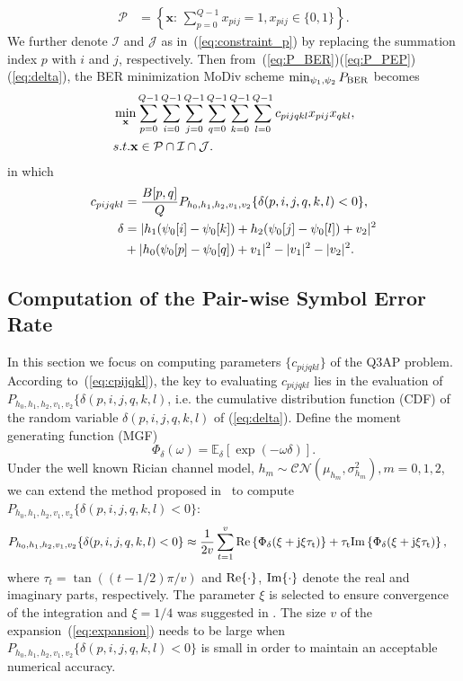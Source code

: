 \documentclass[journal,draftcls,onecolumn,12pt,twoside]{IEEEtran}
\newcommand{\BER}{\rm{BER}}
\renewcommand{\Re}{\rm Re}
\renewcommand{\Im}{\rm Im}
\begin{document}
\begin{align}
    \mathcal{P} & = \left\{\mathbf{x}:\,\sum_{p=0}^{Q-1}x_{pij} = 1,
    x_{pij}\in\{0, 1\}\right\}. \label{eq:constraint_p}
\end{align}
We further denote $\mathcal{I}$ and $\mathcal{J}$ as in~(\ref{eq:constraint_p})
by replacing the summation index $p$ with $i$ and $j$, respectively. Then
from~(\ref{eq:P_BER})(\ref{eq:P_PEP})(\ref{eq:delta}), the BER minimization
MoDiv scheme $\min_{\psi_1, \psi_2}P_{\BER}$ becomes
\begin{align}
    & \min_{\mathbf{x}}\sum_{p=0}^{Q-1}\sum_{i=0}^{Q-1}\sum_{j=0}^{Q-1}
    \sum_{q=0}^{Q-1}\sum_{k=0}^{Q-1}\sum_{l=0}^{Q-1}c_{pijqkl}x_{pij}x_{qkl},
    \label{eq:Q3AP}\\
    & \mbox{s.t. } \mathbf{x}\in \mathcal{P}\cap\mathcal{I}\cap\mathcal{J}.
    \notag
\end{align}
in which
\begin{align}
    c_{pijqkl} & = \frac{B[p, q]}{Q}P_{h_0,h_1,h_2,v_1,v_2}\{\delta(p,i,j,q,k,l)
    < 0\},
    \label{eq:cpijqkl} \\
    \delta & = |h_1(\psi_0[i] - \psi_0[k])+h_2(\psi_0[j] - \psi_0[l])+v_2|^2 
 \notag
    \\
    & + |h_0(\psi_0[p] - \psi_0[q]) + v_1|^2 - |v_1|^2 -
    |v_2|^2.\label{eq:delta_pijqkl}
\end{align}

\subsection{Computation of the Pair-wise Symbol Error Rate}

In this section we focus on computing parameters $\{c_{pijqkl}\}$ of the Q3AP
problem. According to~(\ref{eq:cpijqkl}), the key to evaluating $c_{pijqkl}$
lies in the evaluation of $P_{h_0,h_1,h_2,v_1,v_2}\{\delta(p,i,j,q,k,l)$, i.e.
the cumulative distribution function (CDF) of the random variable
$\delta(p,i,j,q,k,l)$ of (\ref{eq:delta}). Define the moment generating function
(MGF)
\[
    \Phi_{\delta}(\omega) = \mathbb{E}_{\delta}[\exp(-\omega\delta)].
\]
Under the well known Rician channel model, 
$h_m\sim\mathcal{CN}(\mu_{h_m},\sigma_{h_m}^2), m=0,1,2$, we can extend the
method proposed in~\cite{harvind2005symbol, taricco2002exact} to compute
$P_{h_0,h_1,h_2,v_1,v_2}\{\delta(p,i,j,q,k,l) < 0\}$:
\begin{align}
    & P_{h_0,h_1,h_2,v_1,v_2}\{\delta(p,i,j,q,k,l) < 0\} \approx
    \frac{1}{2v}\sum_{t=1}^v \Re\left\{\Phi_{\delta}(\xi + j\xi\tau_t)\right\} +
    \tau_t\Im\left\{\Phi_{\delta}(\xi + j\xi\tau_t)\right\},
    \label{eq:expansion}
\end{align}
where $\tau_t = \tan((t- 1/2)\pi/v)$ and $\Re\{\cdot\}$, $\Im\{\cdot\}$ denote
the real and imaginary parts, respectively. The parameter $\xi$ is selected to
ensure convergence of the integration and $\xi = 1/4$ was suggested in
\cite{taricco2002exact}. The size $v$ of the expansion~(\ref{eq:expansion})
needs to be large when $ P_{h_0,h_1,h_2,v_1,v_2}\{\delta(p,i,j,q,k,l) < 0\}$ is
small in order to maintain an acceptable numerical accuracy.
\end{document}
